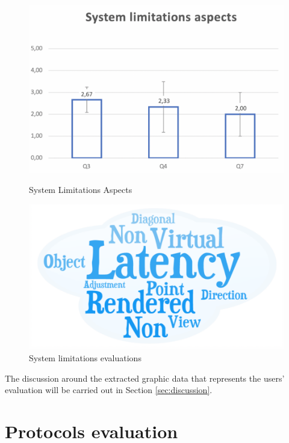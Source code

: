 \begin{figure}[!htbp]
\center
\begin{minipage}{0.495\linewidth}
\center
\captionsetup{justification=centering,margin=0.5cm,font=small}
\includegraphics[width=1\linewidth]{img/cap6/sLimitationAspExcel}
\caption{System Limitations Aspects} \label{fig:sLimExcel}
\end{minipage}
\begin{minipage}{0.495\linewidth}
\center
\captionsetup{justification=centering,margin=0cm,font=small}
\includegraphics[width=1\linewidth]{img/cap6/sLimitationAspWordClouds}
\caption{System limitations evaluations} \label{fig:sLimWC}
\end{minipage}
\end{figure}


The discussion around the extracted graphic data that represents the users' evaluation will be carried out in Section \ref{sec:discussion}.

\section{{Protocols evaluation}}

